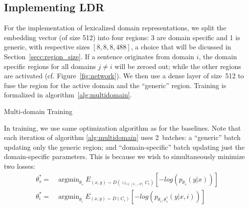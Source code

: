 \documentclass[11pt,a4paper]{article}
\DeclareMathOperator*{\argmin}{argmin}
\newcommand{\fyTodo}[1]{\Todo[FY:]{\textcolor{orange}{#1}}}
\begin{document}
\subsection{Implementing LDR}\fyTodo{Check acronym.}
\fyTodo{Motivate the split - discuss experimentally embedding size}
For the implementation of lexicalized domain representations, we split the embedding vector (of size 512) into four regions: 3 are domain specific and 1 is generic, with respective sizes $[8,8,8,488]$, a choice that will be dicussed in Section~\ref{secc:region_size}. If a sentence originates from domain $i$, the domain specific regions for all domains $j \neq i$ will be zeroed out; while the other regions are activated (cf. Figure~\ref{fig:network}). We then use a dense layer of size~512 to fuse the region for the active domain and the ``generic'' region. Training is formalized in algorithm~\ref{alg:multidomain}.

\begin{algorithm}[h]
\caption{Multi-domain Training}
\label{alg:multidomain}
\begin{algorithmic}[1]
\REPEAT 
{}
\end{algorithmic}
\end{algorithm}

In training, we use same optimization algorithm as for the baselines. Note that each iteration of algorithm \ref{alg:multidomain} uses 2~batches: a ``generic'' batch updating only the generic region; and ``domain-specific'' batch updating just the domain-specific parameters. This is because we wish to simultaneously minimize two losses:
\begin{align*}
\theta^*_{s}=&\displaystyle{\mathop{\argmin}_{\theta_s}}E_{(x,y) \sim D(\displaystyle{\mathop{\cup}_{i \in [1,..,d]}}C_{i})}[-log(p_{\theta_s}(y|x))] \\ 
 \theta^*_{i}=&\displaystyle{\mathop{\argmin}_{\theta_i}}E_{(x,y) \sim D(C_{i})}[-log(p_{\theta_i,\theta^*_s}(y|x,i))]
\end{align*} 
\end{document}
